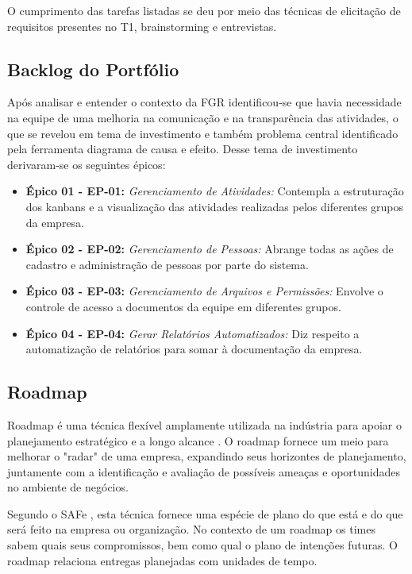 O cumprimento das tarefas listadas se deu por meio das técnicas de elicitação de requisitos presentes no T1,
 brainstorming e entrevistas.

\subsection{Backlog do Portfólio}

Após analisar e entender o contexto da FGR identificou-se que havia necessidade na equipe de uma melhoria na comunicação
 e na transparência das atividades, o que se revelou em tema de investimento e também problema central identificado pela
  ferramenta diagrama de causa e efeito. Desse tema de investimento derivaram-se os seguintes épicos:

\begin{itemize}
  \item \textbf{Épico 01 - EP-01:} \textit{Gerenciamento de Atividades:} Contempla a estruturação dos kanbans e a visualização das atividades realizadas pelos diferentes grupos da empresa.
  \item \textbf{Épico 02 - EP-02:} \textit{Gerenciamento de Pessoas:} Abrange todas as ações de cadastro e administração de pessoas por parte do sistema.
  \item \textbf{Épico 03 - EP-03:} \textit{Gerenciamento de Arquivos e Permissões:} Envolve o controle de acesso a documentos da equipe em diferentes grupos.
  \item \textbf{Épico 04 - EP-04:} \textit{Gerar Relatórios Automatizados:} Diz respeito a automatização de relatórios para somar à documentação da empresa.
\end{itemize}


\subsection{Roadmap}
Roadmap é uma técnica flexível amplamente utilizada na indústria para apoiar o planejamento estratégico e a longo
alcance \cite{phaal}. O roadmap fornece um meio para melhorar o "radar" de uma empresa, expandindo seus horizontes de
planejamento, juntamente com a identificação e avaliação de possíveis ameaças e oportunidades no ambiente de negócios.

Segundo o SAFe \cite{safe}, esta técnica fornece uma espécie de plano do que está e do que será feito na empresa ou organização.
No contexto de um roadmap os times sabem quais seus compromissos, bem como qual o plano de intenções futuras. O roadmap
relaciona entregas planejadas com unidades de tempo.


